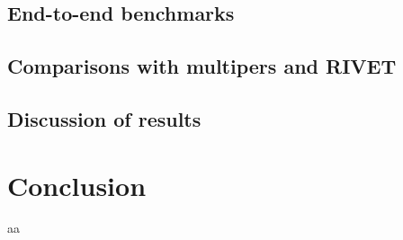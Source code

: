 \documentclass{article}
\newcommand{\<}{\langle}
\renewcommand{\>}{\rangle}
\theoremstyle{definition}
\theoremstyle{remark}
\begin{document}
	\subsection{End-to-end benchmarks}

	\subsection{Comparisons with multipers and RIVET}
	
	\subsection{Discussion of results}
	
	\section{Conclusion}
	aa
	
\end{document}
